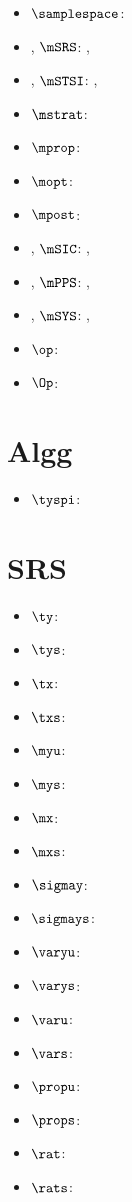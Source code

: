 
\begin{itemize}
    \item $\samplespace$: 
    \item \SRS, $\mSRS$: , 
    \item \STSI, $\mSTSI$: , 
    \item $\mstrat$: 
    \item $\mprop$: 
    \item $\mopt$: 
    \item $\mpost$: 
    \item \SIC, $\mSIC$: , 
    \item \PPS, $\mPPS$: , 
    \item \SYS, $\mSYS$: , 
    \item $\op$: 
    \item $\Op$: 
\end{itemize}


\section{Algg}
\begin{itemize}
    \item $\tyspi$: 
\end{itemize}

\section{SRS}
\begin{itemize}
    \item $\ty$: 
    \item $\tys$: 
    \item $\tx$: 
    \item $\txs$: 
    \item $\myu$: 
    \item $\mys$: 
    \item $\mx$: 
    \item $\mxs$: 
    \item $\sigmay$: 
    \item $\sigmays$: 
    \item $\varyu$: 
    \item $\varys$: 
    \item $\varu$: 
    \item $\vars$: 
    \item $\propu$: 
    \item $\props$: 
    \item $\rat$: 
    \item $\rats$: 
\end{itemize}

